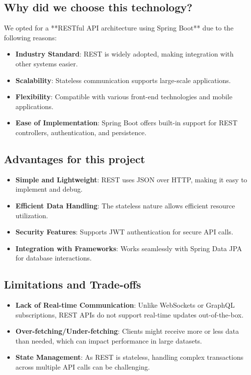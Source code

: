 \documentclass[a4paper, 11pt]{article}
\begin{document}
\subsection{Why did we choose this technology?}
We opted for a **RESTful API architecture using Spring Boot** due to the following reasons:
\begin{itemize}
    \item \textbf{Industry Standard}: REST is widely adopted, making integration with other systems easier.
    \item \textbf{Scalability}: Stateless communication supports large-scale applications.
    \item \textbf{Flexibility}: Compatible with various front-end technologies and mobile applications.
    \item \textbf{Ease of Implementation}: Spring Boot offers built-in support for REST controllers, authentication, and persistence.
\end{itemize}

\subsection{Advantages for this project}
\begin{itemize}
    \item \textbf{Simple and Lightweight}: REST uses JSON over HTTP, making it easy to implement and debug.
    \item \textbf{Efficient Data Handling}: The stateless nature allows efficient resource utilization.
    \item \textbf{Security Features}: Supports JWT authentication for secure API calls.
    \item \textbf{Integration with Frameworks}: Works seamlessly with Spring Data JPA for database interactions.
\end{itemize}

\subsection{Limitations and Trade-offs}
\begin{itemize}
    \item \textbf{Lack of Real-time Communication}: Unlike WebSockets or GraphQL subscriptions, REST APIs do not support real-time updates out-of-the-box.
    \item \textbf{Over-fetching/Under-fetching}: Clients might receive more or less data than needed, which can impact performance in large datasets.
    \item \textbf{State Management}: As REST is stateless, handling complex transactions across multiple API calls can be challenging.
\end{itemize}
\end{document}
